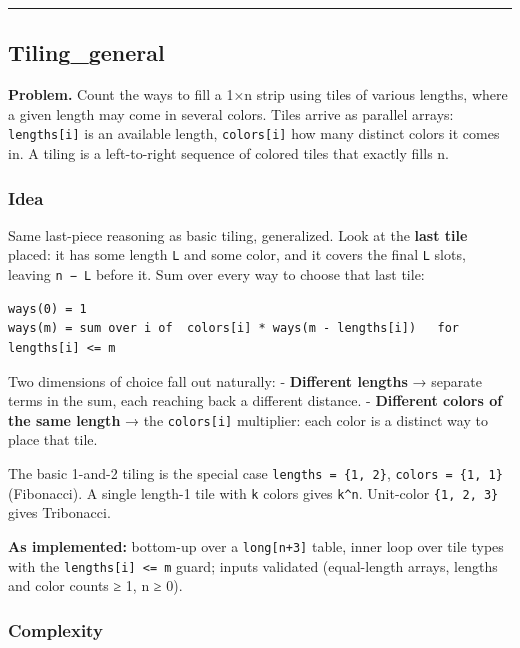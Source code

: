 \documentclass[
  10pt,
  letterpaper,
  onecolumn]{article}
\begin{document}
\begin{center}\rule{0.5\linewidth}{0.5pt}\end{center}

\hypertarget{tiling_general}{%
\subsection{Tiling\_general}\label{tiling_general}}

\textbf{Problem.} Count the ways to fill a 1×n strip using tiles of
various lengths, where a given length may come in several colors. Tiles
arrive as parallel arrays: \texttt{lengths{[}i{]}} is an available
length, \texttt{colors{[}i{]}} how many distinct colors it comes in. A
tiling is a left-to-right sequence of colored tiles that exactly fills
n.

\hypertarget{idea-9}{%
\subsubsection{Idea}\label{idea-9}}

Same last-piece reasoning as basic tiling, generalized. Look at the
\textbf{last tile} placed: it has some length \texttt{L} and some color,
and it covers the final \texttt{L} slots, leaving \texttt{n\ −\ L}
before it. Sum over every way to choose that last tile:

\begin{verbatim}
ways(0) = 1
ways(m) = sum over i of  colors[i] * ways(m - lengths[i])   for lengths[i] <= m
\end{verbatim}

Two dimensions of choice fall out naturally: - \textbf{Different
lengths} → separate terms in the sum, each reaching back a different
distance. - \textbf{Different colors of the same length} → the
\texttt{colors{[}i{]}} multiplier: each color is a distinct way to place
that tile.

The basic 1-and-2 tiling is the special case
\texttt{lengths\ =\ \{1,\ 2\}}, \texttt{colors\ =\ \{1,\ 1\}}
(Fibonacci). A single length-1 tile with \texttt{k} colors gives
\texttt{k\^{}n}. Unit-color \texttt{\{1,\ 2,\ 3\}} gives Tribonacci.

\textbf{As implemented:} bottom-up over a \texttt{long{[}n+3{]}} table,
inner loop over tile types with the
\texttt{lengths{[}i{]}\ \textless{}=\ m} guard; inputs validated
(equal-length arrays, lengths and color counts ≥ 1, n ≥ 0).

\hypertarget{complexity-9}{%
\subsubsection{Complexity}\label{complexity-9}}
\end{document}
